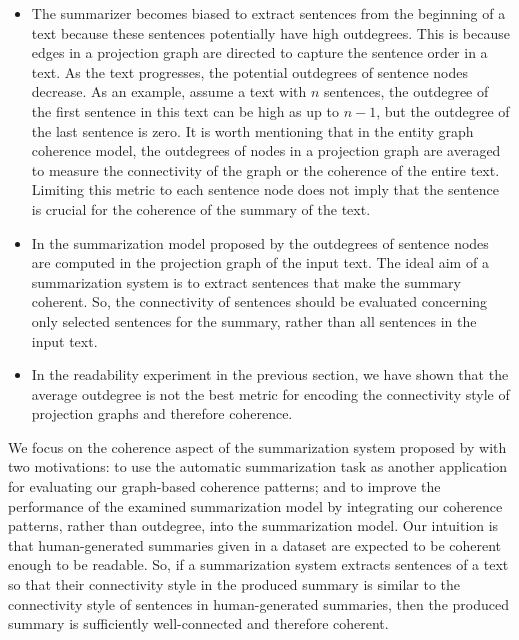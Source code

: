 \begin{itemize}
	\item 
    The summarizer becomes biased to extract sentences from the beginning of a text because these sentences potentially have high outdegrees. 
    This is because edges in a projection graph are directed to capture the sentence order in a text.
    As the text progresses, the potential outdegrees of sentence nodes decrease. 
    As an example, assume a text with $n$ sentences, the outdegree of the first sentence in this text can be high as up to $n-1$, but the outdegree of the last sentence is zero. 
    It is worth mentioning that in the entity graph coherence model, the outdegrees of nodes in a projection graph are averaged to measure the connectivity of the graph or the coherence of the entire text.  
    Limiting this metric to each sentence node does not imply that the sentence is crucial for the coherence of the summary of the text.   
	
	\item 
    In the summarization model proposed by   the outdegrees of sentence nodes are computed in the projection graph of the input text.   
    The ideal aim of a summarization system is to extract sentences that make the summary coherent. 
    So, the connectivity of sentences should be evaluated concerning only selected sentences for the summary, rather than all sentences in the input text. 


	\item In the readability experiment in the previous section, we have shown that the average outdegree is not the best metric for encoding the connectivity style of projection graphs and therefore coherence. 
	
\end{itemize} 

We focus on the coherence aspect of the summarization system proposed by  with two motivations: to use the automatic summarization task as another application for evaluating our graph-based coherence patterns; and to improve the performance of the examined summarization model by integrating our coherence patterns, rather than outdegree, into the summarization model. 
Our intuition is that human-generated summaries given in a dataset are expected to be coherent enough to be readable.
So, if a summarization system extracts sentences of a text so that their connectivity style in the produced summary is similar to the connectivity style of sentences in human-generated summaries, then the produced summary is sufficiently well-connected and therefore coherent. 

